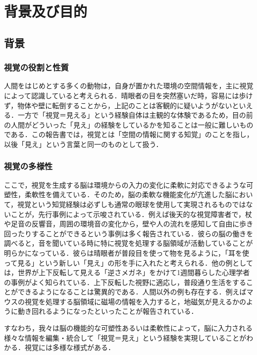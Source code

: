 \section{背景及び目的}
\subsection{背景}
\subsubsection{視覚の役割と性質}
人間をはじめとする多くの動物は，自身が置かれた環境の空間情報を，主に視覚によって認識していると考えられる．晴眼者の目を突然塞いだ時，容易には歩けず，物体や壁に転倒することから，上記のことは客観的に疑いようがないといえる．一方で「視覚＝見える」という経験自体は主観的な体験であるため，目の前の人間がどういった「見え」の経験をしているかを知ることは一般に難しいものである．この報告書では，視覚とは「空間の情報に関する知覚」のことを指し，以後「見え」という言葉と同一のものとして扱う．


\subsubsection{視覚の多様性}
ここで，視覚を生成する脳は環境からの入力の変化に柔軟に対応できるような可塑性，柔軟性を備えている．そのため，脳の柔軟な機能変化が亢進した脳において，視覚という知覚経験は必ずしも通常の眼球を使用して実現されるものではないことが，先行事例によって示唆されている．例えば後天的な視覚障害者で，杖や足音の反響音，周囲の環境音の変化から，壁や人の流れを感知して自由に歩き回ったりすることができるという事例は多く報告されている．彼らの脳の働きを調べると，音を聞いている時に特に視覚を処理する脳領域が活動していることが明らかになっている．彼らは晴眼者が普段目を使って物を見るように，「耳を使って見る」という新しい「見え」の形を手に入れたと考えられる．他の例としては，世界が上下反転して見える「逆さメガネ」をかけて1週間暮らした心理学者の事例がよく知られている．上下反転した視野に適応し，普段通り生活をすることができるようになることは驚異的である．人間以外の例も存在する．例えばマウスの視覚を処理する脳領域に磁場の情報を入力すると，地磁気が見えるかのように動き回れるようになったといったことが報告されている．

すなわち，我々は脳の機能的な可塑性あるいは柔軟性によって，脳に入力される様々な情報を編集・統合して「視覚＝見え」という経験を実現していることがわかる．視覚には多様な様式がある．

